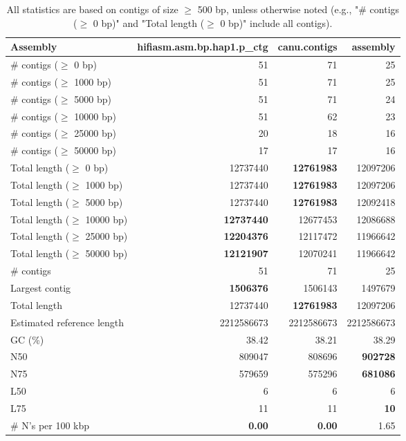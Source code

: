 \documentclass[12pt,a4paper]{article}
\begin{document}
\begin{table}[ht]
\begin{center}
\caption{All statistics are based on contigs of size $\geq$ 500 bp, unless otherwise noted (e.g., "\# contigs ($\geq$ 0 bp)" and "Total length ($\geq$ 0 bp)" include all contigs).}
\begin{tabular}{|l*{3}{|r}|}
\hline
Assembly & hifiasm.asm.bp.hap1.p\_ctg & canu.contigs & assembly \\ \hline
\# contigs ($\geq$ 0 bp) & 51 & 71 & 25 \\ \hline
\# contigs ($\geq$ 1000 bp) & 51 & 71 & 25 \\ \hline
\# contigs ($\geq$ 5000 bp) & 51 & 71 & 24 \\ \hline
\# contigs ($\geq$ 10000 bp) & 51 & 62 & 23 \\ \hline
\# contigs ($\geq$ 25000 bp) & 20 & 18 & 16 \\ \hline
\# contigs ($\geq$ 50000 bp) & 17 & 17 & 16 \\ \hline
Total length ($\geq$ 0 bp) & 12737440 & {\bf 12761983} & 12097206 \\ \hline
Total length ($\geq$ 1000 bp) & 12737440 & {\bf 12761983} & 12097206 \\ \hline
Total length ($\geq$ 5000 bp) & 12737440 & {\bf 12761983} & 12092418 \\ \hline
Total length ($\geq$ 10000 bp) & {\bf 12737440} & 12677453 & 12086688 \\ \hline
Total length ($\geq$ 25000 bp) & {\bf 12204376} & 12117472 & 11966642 \\ \hline
Total length ($\geq$ 50000 bp) & {\bf 12121907} & 12070241 & 11966642 \\ \hline
\# contigs & 51 & 71 & 25 \\ \hline
Largest contig & {\bf 1506376} & 1506143 & 1497679 \\ \hline
Total length & 12737440 & {\bf 12761983} & 12097206 \\ \hline
Estimated reference length & 2212586673 & 2212586673 & 2212586673 \\ \hline
GC (\%) & 38.42 & 38.21 & 38.29 \\ \hline
N50 & 809047 & 808696 & {\bf 902728} \\ \hline
N75 & 579659 & 575296 & {\bf 681086} \\ \hline
L50 & 6 & 6 & 6 \\ \hline
L75 & 11 & 11 & {\bf 10} \\ \hline
\# N's per 100 kbp & {\bf 0.00} & {\bf 0.00} & 1.65 \\ \hline
\end{tabular}
\end{center}
\end{table}
\end{document}
